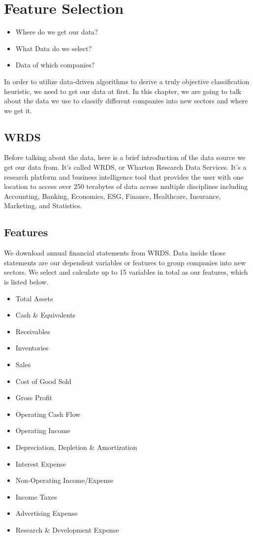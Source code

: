 \documentclass[../main.tex]{subfiles}
\begin{document}
\chapter{Feature Selection} \label{feature_selection}
  
\begin{itemize}
    \item Where do we get our data?
    \item What Data do we select?
    \item Data of which companies?
\end{itemize}

In order to utilize data-driven algorithms to derive a truly objective classification heuristic, we need to get our data at first. In this chapter, we are going to talk about the data we use to classify different companies into new sectors and where we get it.

\section{WRDS}

Before talking about the data, here is a brief introduction of the data source we get our data from. It's called WRDS, or Wharton Research Data Services. It's a research platform and business intelligence tool that provides the user with one location to access over 250 terabytes of data across multiple disciplines including Accounting, Banking, Economics, ESG, Finance, Healthcare, Insurance, Marketing, and Statistics. 

\section{Features}

We download annual financial statements from WRDS. Data inside those statements are our dependent variables or features to group companies into new sectors. We select and calculate up to 15 variables in total as our features, which is listed below.

\begin{itemize}
    \item Total Assets
    \item Cash \& Equivalents
    \item Receivables
    \item Inventories
    \item Sales
    \item Cost of Good Sold
    \item Gross Profit
    \item Operating Cash Flow
    \item Operating Income
	\item Depreciation, Depletion \& Amortization
	\item Interest Expense
	\item Non-Operating Income/Expense
	\item Income Taxes
	\item Advertising Expense
	\item Research \& Development Expense
	\\~\\
\end{itemize}
\end{document}

